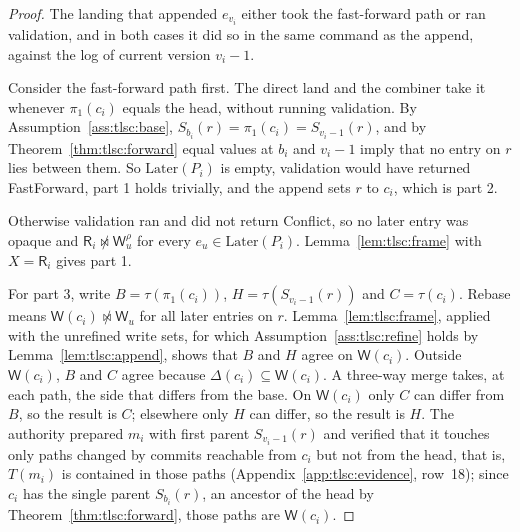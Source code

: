 \documentclass[11pt,letterpaper]{article}
\theoremstyle{definition}
\theoremstyle{remark}
\newcommand{\R}{\mathsf{R}}
\newcommand{\W}{\mathsf{W}}
\newcommand{\Snap}[1]{S_{#1}}
\newcommand{\nmeets}{\not\bowtie}
\newcommand{\Later}{\mathrm{Later}}
\newcommand{\tree}{\tau}
\newcommand{\fp}{\pi_1}
\begin{document}
\begin{proof}
The landing that appended $e_{v_i}$ either took the fast-forward path or ran validation, and in both cases it did so in the same command as the append, against the log of current version $v_i-1$.

Consider the fast-forward path first. The direct land and the combiner take it whenever $\fp(c_i)$ equals the head, without running validation. By Assumption~\ref{ass:tlsc:base}, $\Snap{b_i}(r)=\fp(c_i)=\Snap{v_i-1}(r)$, and by Theorem~\ref{thm:tlsc:forward} equal values at $b_i$ and $v_i-1$ imply that no entry on $r$ lies between them. So $\Later(P_i)$ is empty, validation would have returned FastForward, part 1 holds trivially, and the append sets $r$ to $c_i$, which is part 2.

Otherwise validation ran and did not return Conflict, so no later entry was opaque and $\R_i\nmeets\W^{\rho}_u$ for every $e_u\in\Later(P_i)$. Lemma~\ref{lem:tlsc:frame} with $X=\R_i$ gives part 1.

For part 3, write $B=\tree(\fp(c_i))$, $H=\tree(\Snap{v_i-1}(r))$ and $C=\tree(c_i)$. Rebase means $\W(c_i)\nmeets\W_u$ for all later entries on $r$. Lemma~\ref{lem:tlsc:frame}, applied with the unrefined write sets, for which Assumption~\ref{ass:tlsc:refine} holds by Lemma~\ref{lem:tlsc:append}, shows that $B$ and $H$ agree on $\W(c_i)$. Outside $\W(c_i)$, $B$ and $C$ agree because $\Delta(c_i)\subseteq\W(c_i)$. A three-way merge takes, at each path, the side that differs from the base. On $\W(c_i)$ only $C$ can differ from $B$, so the result is $C$; elsewhere only $H$ can differ, so the result is $H$. The authority prepared $m_i$ with first parent $\Snap{v_i-1}(r)$ and verified that it touches only paths changed by commits reachable from $c_i$ but not from the head, that is, $T(m_i)$ is contained in those paths (Appendix~\ref{app:tlsc:evidence}, row~18); since $c_i$ has the single parent $\Snap{b_i}(r)$, an ancestor of the head by Theorem~\ref{thm:tlsc:forward}, those paths are $\W(c_i)$.


\end{proof}
\end{document}
